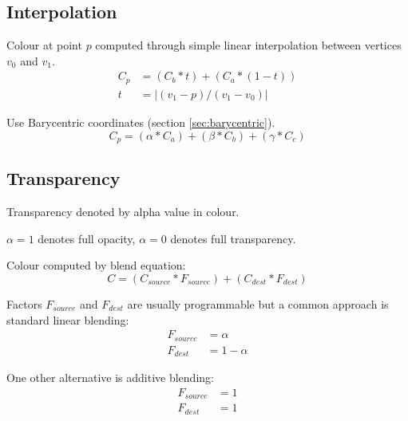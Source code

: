 \documentclass[a4paper]{article}
\begin{document}
\subsection{Interpolation}


Colour at point $p$ computed through simple linear interpolation between
vertices $v_{0}$ and $v_{1}$.
\begin{align*}
  C_{p} &= (C_{b} * t) + (C_{a} * (1 - t)) \\
      t &= |(v_{1} - p) / (v_{1} - v_{0})|
\end{align*}


Use Barycentric coordinates (section \ref{sec:barycentric}).
\[
  C_{p} = (\alpha * C_{a}) + (\beta * C_{b}) + (\gamma * C_{c})
\]

\subsection{Transparency}

Transparency denoted by alpha value in colour.

$\alpha = 1$ denotes full opacity, $\alpha = 0$ denotes full transparency.

Colour computed by blend equation:
\[
  C = (C_{source} * F_{source}) + (C_{dest} * F_{dest})
\]

Factors $F_{source}$ and $F_{dest}$ are usually programmable but a common
approach is standard linear blending:
\begin{align*}
  F_{source} &= \alpha \\
    F_{dest} &= 1 - \alpha
\end{align*}

One other alternative is additive blending:
\begin{align*}
  F_{source} &= 1 \\
    F_{dest} &= 1
\end{align*}
\end{document}

